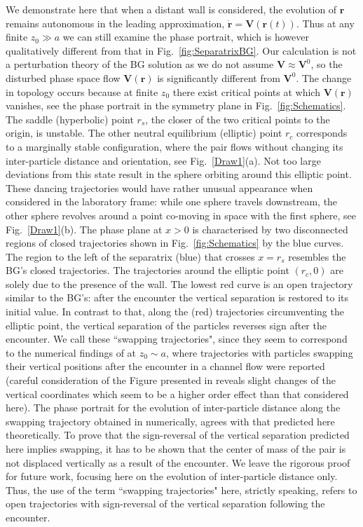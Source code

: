 We demonstrate here that when a distant wall is considered, the evolution of $\bm r$ remains autonomous in the leading approximation, $\dot{\bm r}=\bm V(\bm r(t))$. Thus at any finite $z_0\gg a$  we can still examine the phase portrait, which is however qualitatively different from that in Fig.~\ref{fig:SeparatrixBG}. Our calculation is not a perturbation theory of the BG solution as we do not assume $\bm V\approx \bm V^0$, so the disturbed phase space flow $\bm V(\bm r)$ is significantly different from $\bm V^0$. The change in topology occurs because at finite $z_0$ there exist critical points at which $\bm V(\bm r)$ vanishes, see the phase portrait in the symmetry plane in Fig.~\ref{fig:Schematics}. The saddle (hyperbolic) point $r_s$, the closer of the two critical points to the origin, is unstable. The other neutral equilibrium (elliptic) point $r_c$ corresponds to a marginally stable configuration, where the pair flows without changing its inter-particle distance and orientation, see Fig.~\ref{Draw1}(a). Not too large deviations from this state result in the sphere orbiting around this elliptic point. These dancing trajectories would have rather unusual appearance when considered in the laboratory frame: while one sphere travels downstream, the other sphere revolves around a point co-moving in space with the first sphere, see Fig.~\ref{Draw1}(b). The phase plane at $x>0$ is characterised by two disconnected regions of closed trajectories shown in Fig.~\ref{fig:Schematics} by the blue curves. The region to the left of
the separatrix (blue) that crosses $x=r_s$ resembles the BG's closed trajectories. The trajectories around the elliptic point $(r_c, 0)$ are solely due to the presence of the wall. The lowest red curve is an open trajectory similar to the BG's: after the encounter the vertical separation is restored to its initial value. In contrast to that, along the (red) trajectories circumventing the elliptic point, the vertical separation of the particles reverses sign after the encounter. We call these ``swapping trajectories", since they seem to correspond to the numerical findings of \cite{zurita-gotor_2007} at $z_0\sim a$, where trajectories with particles swapping their vertical positions after the encounter in a channel flow were reported (careful consideration of the Figure presented in \cite{zurita-gotor_2007} reveals slight changes of the vertical coordinates which seem to be a higher order effect than that considered here). The phase portrait for the evolution of inter-particle distance along the swapping trajectory obtained in \cite{zurita-gotor_2007} numerically, agrees with that predicted here theoretically. To prove that the sign-reversal of the vertical separation predicted here implies swapping, it has to be shown that the center of mass of the pair is not displaced vertically as a result of the encounter. We leave the rigorous proof for future work, focusing here on the evolution of inter-particle distance only. Thus, the use of the term ``swapping trajectories" here, strictly speaking, refers to open trajectories with sign-reversal of the vertical separation following the encounter.

